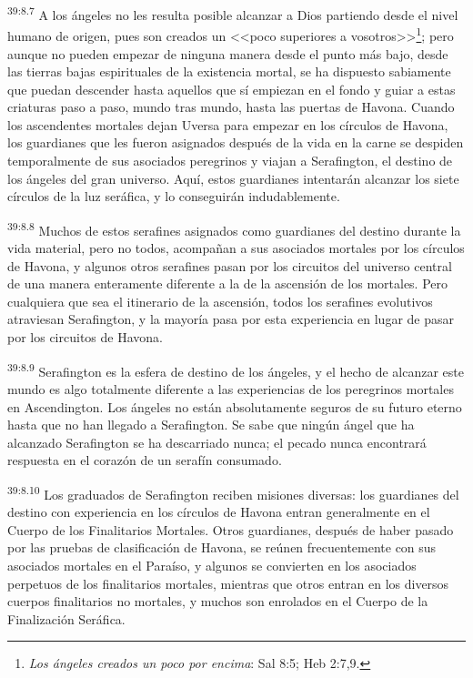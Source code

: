 \par
\textsuperscript{39:8.7} A los ángeles no les resulta posible alcanzar a Dios partiendo desde el nivel humano de origen, pues son creados un <<poco superiores a vosotros>>\footnote{\textit{Los ángeles creados un poco por encima}: Sal 8:5; Heb 2:7,9.}; pero aunque no pueden empezar de ninguna manera desde el punto más bajo, desde las tierras bajas espirituales de la existencia mortal, se ha dispuesto sabiamente que puedan descender hasta aquellos que sí empiezan en el fondo y guiar a estas criaturas paso a paso, mundo tras mundo, hasta las puertas de Havona. Cuando los ascendentes mortales dejan Uversa para empezar en los círculos de Havona, los guardianes que les fueron asignados después de la vida en la carne se despiden temporalmente de sus asociados peregrinos y viajan a Serafington, el destino de los ángeles del gran universo. Aquí, estos guardianes intentarán alcanzar los siete círculos de la luz seráfica, y lo conseguirán indudablemente.

\par
\textsuperscript{39:8.8} Muchos de estos serafines asignados como guardianes del destino durante la vida material, pero no todos, acompañan a sus asociados mortales por los círculos de Havona, y algunos otros serafines pasan por los circuitos del universo central de una manera enteramente diferente a la de la ascensión de los mortales. Pero cualquiera que sea el itinerario de la ascensión, todos los serafines evolutivos atraviesan Serafington, y la mayoría pasa por esta experiencia en lugar de pasar por los circuitos de Havona.

\par
\textsuperscript{39:8.9} Serafington es la esfera de destino de los ángeles, y el hecho de alcanzar este mundo es algo totalmente diferente a las experiencias de los peregrinos mortales en Ascendington. Los ángeles no están absolutamente seguros de su futuro eterno hasta que no han llegado a Serafington. Se sabe que ningún ángel que ha alcanzado Serafington se ha descarriado nunca; el pecado nunca encontrará respuesta en el corazón de un serafín consumado.

\par
\textsuperscript{39:8.10} Los graduados de Serafington reciben misiones diversas: los guardianes del destino con experiencia en los círculos de Havona entran generalmente en el Cuerpo de los Finalitarios Mortales. Otros guardianes, después de haber pasado por las pruebas de clasificación de Havona, se reúnen frecuentemente con sus asociados mortales en el Paraíso, y algunos se convierten en los asociados perpetuos de los finalitarios mortales, mientras que otros entran en los diversos cuerpos finalitarios no mortales, y muchos son enrolados en el Cuerpo de la Finalización Seráfica.


